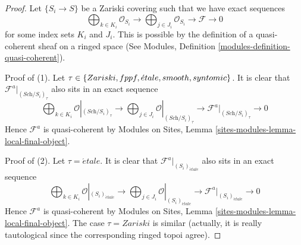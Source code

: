 \begin{proof}
Let $\{S_i \to S\}$ be a Zariski covering such that we have exact sequences
$$
\bigoplus\nolimits_{k \in K_i} \mathcal{O}_{S_i} \longrightarrow
\bigoplus\nolimits_{j \in J_i} \mathcal{O}_{S_i} \longrightarrow
\mathcal{F} \longrightarrow 0
$$
for some index sets $K_i$ and $J_i$. This is possible by the definition
of a quasi-coherent sheaf on a ringed space
(See Modules, Definition \ref{modules-definition-quasi-coherent}).

\medskip\noindent
Proof of (1). Let $\tau \in \{Zariski,\linebreak[0] fppf,\linebreak[0]
\acute{e}tale,\linebreak[0] smooth,\linebreak[0] syntomic\}$.
It is clear that $\mathcal{F}^a|_{(\textit{Sch}/S_i)_\tau}$ also
sits in an exact sequence
$$
\bigoplus\nolimits_{k \in K_i} \mathcal{O}|_{(\textit{Sch}/S_i)_\tau}
\longrightarrow
\bigoplus\nolimits_{j \in J_i} \mathcal{O}|_{(\textit{Sch}/S_i)_\tau}
\longrightarrow
\mathcal{F}^a|_{(\textit{Sch}/S_i)_\tau} \longrightarrow 0
$$
Hence $\mathcal{F}^a$ is quasi-coherent by Modules on Sites,
Lemma \ref{sites-modules-lemma-local-final-object}.

\medskip\noindent
Proof of (2). Let $\tau = \acute{e}tale$.
It is clear that $\mathcal{F}^a|_{(S_i)_{\acute{e}tale}}$ also sits
in an exact sequence
$$
\bigoplus\nolimits_{k \in K_i} \mathcal{O}|_{(S_i)_{\acute{e}tale}}
\longrightarrow
\bigoplus\nolimits_{j \in J_i} \mathcal{O}|_{(S_i)_{\acute{e}tale}}
\longrightarrow
\mathcal{F}^a|_{(S_i)_{\acute{e}tale}} \longrightarrow 0
$$
Hence $\mathcal{F}^a$ is quasi-coherent by Modules on Sites,
Lemma \ref{sites-modules-lemma-local-final-object}.
The case $\tau = Zariski$ is similar (actually, it is really
tautological since the corresponding ringed topoi agree).
\end{proof}

